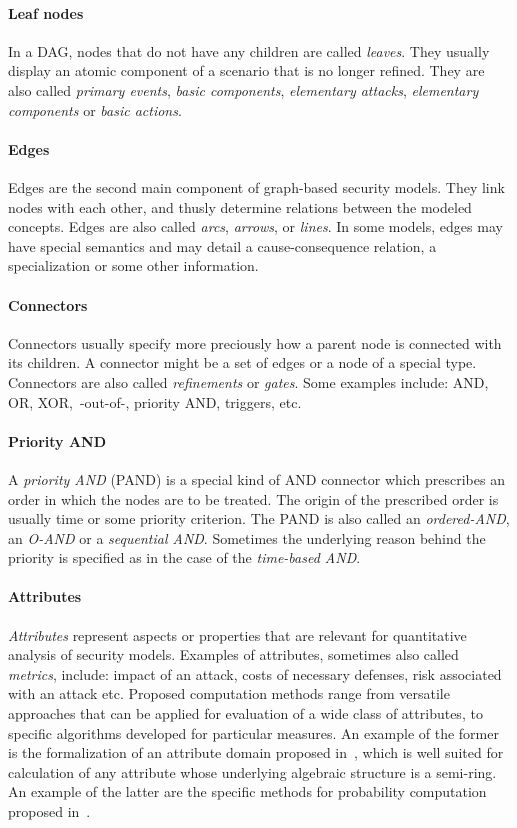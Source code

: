 \documentclass[a4paper]{article}
\begin{document}
\paragraph{Leaf nodes}
In a DAG, nodes that do not have any children are called \emph{leaves}. They
usually display an atomic component of a scenario that is no longer refined.
They are also called \emph{primary events}, \emph{basic components},
\emph{elementary attacks}, \emph{elementary components} or \emph{basic actions}.

\paragraph{Edges}
Edges are the second main component of graph-based security models. They link
nodes with each other, and thusly determine relations between the modeled
concepts. Edges are also called \emph{arcs}, \emph{arrows}, or \emph{lines}. In
some models, edges may have special semantics and may detail a cause-consequence
relation, a specialization or some other information.

\paragraph{Connectors}
Connectors usually specify more preciously how a parent node is connected with
its children. A connector might be a set of edges or a node of a special type. 
Connectors are also called \emph{refinements} or \emph{gates}. Some examples 
include: AND, OR, XOR,~-out-of-, priority AND, triggers, etc.

\paragraph{Priority AND}
A \emph{priority AND} (PAND) is a special kind of AND connector which prescribes
an order in which the nodes are to be treated. The origin of the prescribed
order is usually time or some priority criterion. The PAND is also called an
\emph{ordered-AND}, an \emph{O-AND} or a \emph{sequential AND}. Sometimes the
underlying reason behind the priority is specified as in the case of the
\emph{time-based AND}.

\paragraph{Attributes}
\emph{Attributes} represent aspects or properties that are relevant for
quantitative analysis of security models. Examples of attributes, sometimes also
called \emph{metrics}, include: impact of an attack, costs of necessary
defenses, risk associated with an attack etc. Proposed computation methods range
from versatile approaches that can be applied for evaluation of a wide class of
attributes, to specific algorithms developed for particular measures. An 
example of the former is the formalization of an attribute domain proposed 
in~\cite{MaOo}, which is well suited for calculation of any attribute whose 
underlying algebraic structure is a semi-ring. An example of the latter are the 
specific methods for probability computation proposed in~\cite{Yage}.
\end{document}
